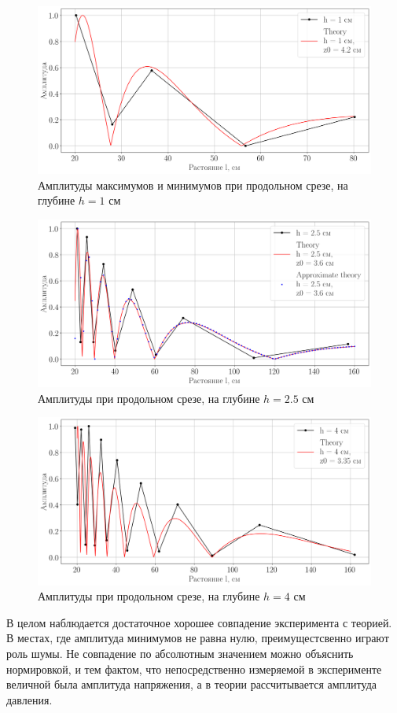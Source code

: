 \begin{figure}[h!]
	\centering
	\includegraphics[width =0.79\linewidth]{fig/task21}
	\caption{Амплитуды максимумов и минимумов при продольном срезе, на глубине $h=1$ см}
	\label{fig:task21}
\end{figure}
\begin{figure}[h!]
	\centering
	\includegraphics[width =0.79\linewidth]{fig/task22}
	\caption{Амплитуды при продольном срезе, на глубине $h=2.5$ см}
	\label{fig:task22}
\end{figure}
\begin{figure}[h!]
	\centering
	\includegraphics[width =0.79\linewidth]{fig/task23}
	\caption{Амплитуды при продольном срезе, на глубине $h=4$ см}
	\label{fig:task23}
\end{figure}

В целом наблюдается достаточное хорошее совпадение эксперимента с теорией. В местах, где амплитуда минимумов не равна
нулю, преимущестсвенно играют роль шумы. Не совпадение по абсолютным значением можно объяснить нормировкой, и тем
фактом, что непосредственно измеряемой в эксперименте величной была амплитуда напряжения, а в теории рассчитывается
амплитуда давления. 


